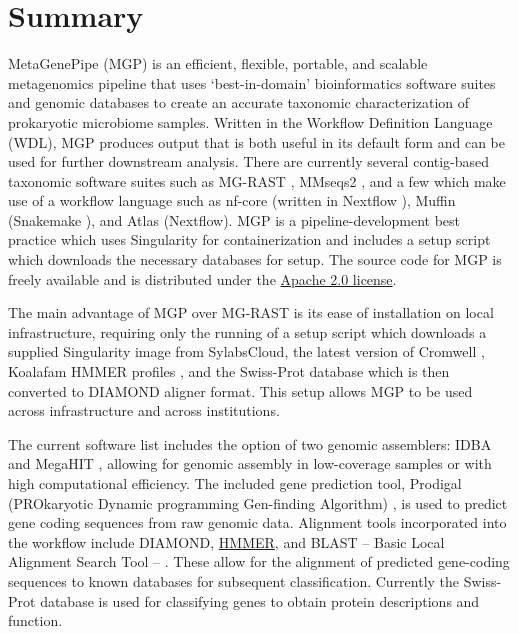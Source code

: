 \hypertarget{summary}{%
\section{Summary}\label{summary}}

MetaGenePipe (MGP) is an efficient, flexible, portable, and scalable
metagenomics pipeline that uses `best-in-domain' bioinformatics software
suites and genomic databases to create an accurate taxonomic
characterization of prokaryotic microbiome samples. Written in the
Workflow Definition Language (WDL), MGP produces output that is both
useful in its default form and can be used for further downstream
analysis. There are currently several contig-based taxonomic software
suites such as MG-RAST \autocite{keegan_glass_meyer_2016}, MMseqs2
\autocite{10.1093/bioinformatics/btab184}, and a few which make use of a
workflow language such as nf-core
\autocite{krakau_straub_gourle_gabernet_nahnsen_2022} (written in
Nextflow
\autocite{di_tommaso_chatzou_floden_barja_palumbo_notredame_2017}),
Muffin
\autocite{van_damme_hölzer_viehweger_müller_bongcam-rudloff_brandt_2021}
(Snakemake
\autocite{mölder_jablonski_letcher_hall_tomkins-tinch_sochat_forster_lee_twardziok_kanitz_et_al._2021}),
and Atlas \autocite{kieser_brown_zdobnov_trajkovski_mccue_2020}
(Nextflow). MGP is a pipeline-development best practice which uses
Singularity \autocite{kurtzer_sochat_bauer_2017} for containerization
and includes a setup script which downloads the necessary databases for
setup. The source code for MGP is freely available and is distributed
under the \href{https://www.apache.org/licenses/LICENSE-2.0}{Apache 2.0
license}.

The main advantage of MGP over MG-RAST is its ease of installation on
local infrastructure, requiring only the running of a setup script which
downloads a supplied Singularity image from SylabsCloud, the latest
version of Cromwell \autocite{voss_van_der_auwera_gentry_2022}, Koalafam
HMMER profiles
\autocite{aramaki_blanc-mathieu_endo_ohkubo_kanehisa_goto_ogata_2019},
and the Swiss-Prot database \autocite{uniprot_consortium_2018} which is
then converted to DIAMOND aligner \autocite{Buchfink2015-rn} format.
This setup allows MGP to be used across infrastructure and across
institutions.

The current software list includes the option of two genomic assemblers:
IDBA \autocite{peng_leung_yiu_chin_2012} and MegaHIT
\autocite{li_liu_luo_sadakane_lam_2015}, allowing for genomic assembly
in low-coverage samples or with high computational efficiency. The
included gene prediction tool, Prodigal (PROkaryotic Dynamic programming
Gen-finding Algorithm)
\autocite{hyatt_chen_locascio_land_larimer_hauser_2010}, is used to
predict gene coding sequences from raw genomic data. Alignment tools
incorporated into the workflow include DIAMOND,
\href{http://hmmer.org/}{HMMER}, and BLAST -- Basic Local Alignment
Search Tool --
\autocite{Camacho2009-hf,Altschul1990-xn,Altschul1997-oe}. These allow
for the alignment of predicted gene-coding sequences to known databases
for subsequent classification. Currently the Swiss-Prot database is used
for classifying genes to obtain protein descriptions and function.

